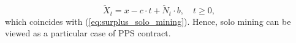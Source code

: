\begin{equation}
\tilde{X}_t = x - c\cdot t + \tilde{N}_t \cdot b, \quad t \geq 0,
\end{equation}
which coincides with (\ref{eq:surplus_solo_mining}). Hence, solo mining can be viewed as a particular case of PPS contract.










